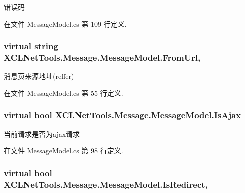 错误码 



在文件 Message\-Model.\-cs 第 109 行定义.

\hypertarget{class_x_c_l_net_tools_1_1_message_1_1_message_model_a36e0a2784c189c86b33b76ceca539a28}{
\subsubsection[{From\-Url}]{\setlength{\rightskip}{0pt plus 5cm}virtual string X\-C\-L\-Net\-Tools.\-Message.\-Message\-Model.\-From\-Url\hspace{0.3cm}{\ttfamily [get]}, {\ttfamily [set]}}}\label{class_x_c_l_net_tools_1_1_message_1_1_message_model_a36e0a2784c189c86b33b76ceca539a28}


消息页来源地址(reffer) 



在文件 Message\-Model.\-cs 第 55 行定义.

\hypertarget{class_x_c_l_net_tools_1_1_message_1_1_message_model_a1ea24cc20f05516f6266af92cc06479a}{
\subsubsection[{Is\-Ajax}]{\setlength{\rightskip}{0pt plus 5cm}virtual bool X\-C\-L\-Net\-Tools.\-Message.\-Message\-Model.\-Is\-Ajax\hspace{0.3cm}{\ttfamily [get]}}}\label{class_x_c_l_net_tools_1_1_message_1_1_message_model_a1ea24cc20f05516f6266af92cc06479a}


当前请求是否为ajax请求 



在文件 Message\-Model.\-cs 第 98 行定义.

\hypertarget{class_x_c_l_net_tools_1_1_message_1_1_message_model_af7a1590f9d2745c3db1486cb39edc070}{
\subsubsection[{Is\-Redirect}]{\setlength{\rightskip}{0pt plus 5cm}virtual bool X\-C\-L\-Net\-Tools.\-Message.\-Message\-Model.\-Is\-Redirect\hspace{0.3cm}{\ttfamily [get]}, {\ttfamily [set]}}}\label{class_x_c_l_net_tools_1_1_message_1_1_message_model_af7a1590f9d2745c3db1486cb39edc070}


